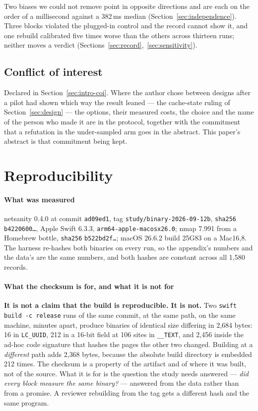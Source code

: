 \documentclass[conference]{IEEEtran}
\newcommand{\netsanity}{\textsf{netsanity}}
\begin{document}
Two biases we could not remove point in opposite directions and are each on the
order of a millisecond against a 382\,ms median (Section~\ref{sec:independence}).
Three blocks violated the plugged-in control and the record cannot show it, and
one rebuild calibrated five times worse than the others across thirteen runs;
neither moves a verdict
(Sections~\ref{sec:record},~\ref{sec:sensitivity}).

\subsection{Conflict of interest}

Declared in Section~\ref{sec:intro-coi}. Where the author chose between designs
after a pilot had shown which way the result leaned --- the cache-state ruling
of Section~\ref{sec:design} --- the options, their measured costs, the choice
and the name of the person who made it are in the protocol, together with the
commitment that a refutation in the under-sampled arm goes in the abstract.
This paper's abstract is that commitment being kept.

\section{Reproducibility}
\label{sec:repro}

\paragraph*{What was measured} \netsanity{} 0.4.0 at commit \texttt{ad09ed1},
tag \texttt{study/binary-2026-09-12b}, \texttt{sha256} \texttt{b4220600\ldots},
Apple Swift 6.3.3, \texttt{arm64-apple-macosx26.0}; nmap 7.991 from a Homebrew
bottle, \texttt{sha256} \texttt{b522bd2f\ldots}; macOS 26.6.2 build 25G83 on a
Mac16,8. The harness re-hashes both binaries on every run, so the appendix's
numbers and the data's are the same numbers, and both hashes are constant
across all 1{,}580 records.

\paragraph*{What the checksum is for, and what it is not for} \textbf{It is not
a claim that the build is reproducible. It is not.} Two \texttt{swift build -c
release} runs of the same commit, at the same path, on the same machine,
minutes apart, produce binaries of identical size differing in 2{,}684 bytes:
16 in \texttt{LC\_UUID}, 212 in a 16-bit field at 106 sites in
\texttt{\_\_TEXT}, and 2{,}456 inside the ad-hoc code signature that hashes the
pages the other two changed. Building at a \emph{different} path adds 2{,}368
bytes, because the absolute build directory is embedded 212 times. The checksum
is a property of the artifact and of where it was built, not of the source.
What it is for is the question the study needs answered --- \emph{did every
block measure the same binary?} --- answered from the data rather than from a
promise. A reviewer rebuilding from the tag gets a different hash and the same
program.
\end{document}
